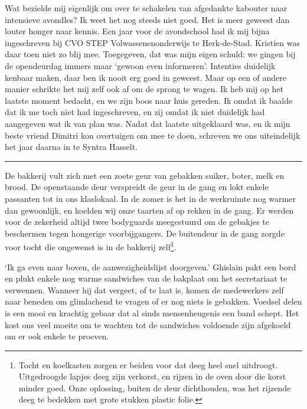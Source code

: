 \documentclass[
  11pt,
  dutch,
]{memoir}
\begin{document}
Wat bezielde mij eigenlijk om over te schakelen van afgedankte kabouter
naar intensieve avondles? Ik weet het nog steeds niet goed. Het is meer
geweest dan louter honger naar kennis. Een jaar voor de avondschool had
ik mij bijna ingeschreven bij CVO STEP Volwassenenonderwijs te
Herk-de-Stad. Kristien was daar toen niet zo blij mee. Toegegeven, dat
was mijn eigen schuld: we gingen bij de opendeurdag immers maar `gewoon
even informeren'. Intenties duidelijk kenbaar maken, daar ben ik nooit
erg goed in geweest. Maar op een of andere manier schrikte het mij zelf
ook af om de sprong te wagen. Ik heb mij op het laatste moment bedacht,
en we zijn boos naar huis gereden. Ik omdat ik baalde dat ik me toch
niet had ingeschreven, en zij omdat ik niet duidelijk had aangegeven wat
ik van plan was. Nadat dat laatste uitgeklaard was, en ik mijn beste
vriend Dimitri kon overtuigen om mee te doen, schreven we ons
uiteindelijk het jaar daarna in te Syntra Hasselt.

\pfbreak

De bakkerij vult zich met een zoete geur van gebakken suiker, boter,
melk en brood. De openstaande deur verspreidt de geur in de gang en lokt
enkele passanten tot in ons klaslokaal. In de zomer is het in de
werkruimte nog warmer dan gewoonlijk, en koelden wij onze taarten af op
rekken in de gang. Er werden voor de zekerheid altijd twee bodyguards
meegestuurd om de gebakjes te beschermen tegen hongerige voorbijgangers.
De buitendeur in de gang zorgde voor tocht die ongewenst is in de
bakkerij zelf\footnote{Tocht en koelkasten zorgen er beiden voor dat
  deeg heel snel uitdroogt. Uitgedroogde lapjes deeg zijn verkorst, en
  rijzen in de oven door die korst minder goed. Onze oplossing, buiten
  de deur dichthouden, was het rijzende deeg te bedekken met grote
  stukken plastic folie.}.

`Ik ga even naar boven, de aanwezigheidslijst doorgeven.' Ghislain pakt
een bord en plukt enkele nog warme sandwiches van de bakplaat om het
secretariaat te verwennen. Wanneer hij dat vergeet, of te laat is, komen
de medewerkers zelf naar beneden om glimlachend te vragen of er nog
niets is gebakken. Voedsel delen is een mooi en krachtig gebaar dat al
sinds mensenheugenis een band schept. Het kost ons veel moeite om te
wachten tot de sandwiches voldoende zijn afgekoeld om er ook enkele te
proeven.
\end{document}
